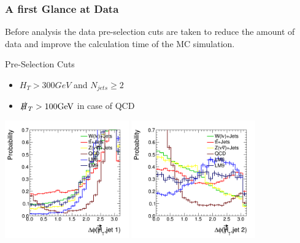 

\begin{frame}
	\frametitle{A first Glance at Data}
	Before analysis the data pre-selection cuts are taken to reduce the amount of data and improve the calculation time of the MC simulation. 
	\begin{block}{Pre-Selection Cuts}
		\begin{itemize}
			\item  $H_T > 300\si{GeV}$ and $N_{\si{jets}} \geq 2$
			\item  $\slashed{H}_T > 100\si{GeV}$ in case of QCD
		\end{itemize}
	\end{block}
	
	\begin{center}
		\includegraphics[width = 0.4\textwidth]{plots10/hDeltaPhi1.png}
		\includegraphics[width = 0.4\textwidth]{plots10/hDeltaPhi2.png}
	\end{center}

\end{frame}

